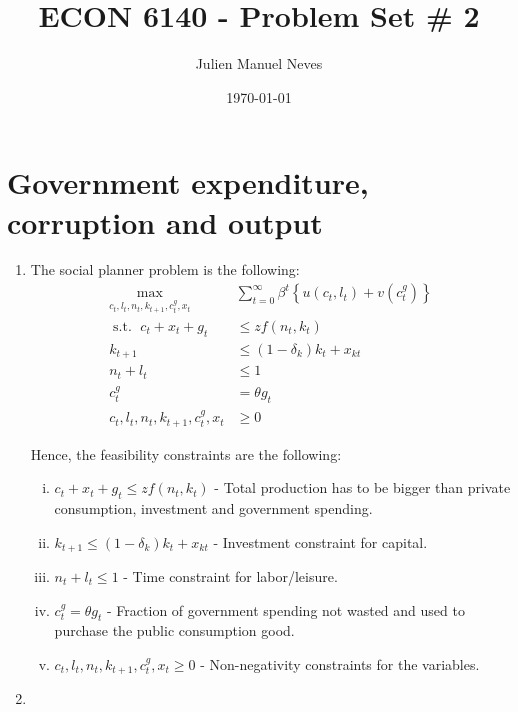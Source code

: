 \documentclass[12pt]{article}
\title{ECON 6140 - Problem Set \# 2}
\date{\today}
\author{Julien Manuel Neves}
\newcommand{\1}{{\bf 1}} %
\DeclareMathOperator{\subjectto}{{s.t.\ }} %
\begin{document}
\maketitle

\section*{Government expenditure, corruption and output}

\begin{enumerate}[(1)]
	\item 
	The social planner problem is the following:
	\begin{align*}
		\max_{c_t,l_t,n_t,k_{t+1}, c_t^g, x_t} &\sum_{t=0}^{\infty} \beta^t \left\lbrace u(c_t,l_t) +v(c_t^g) \right\rbrace \\
		\subjectto c_t+x_t+g_t & \leq zf(n_t,k_t)\\
		k_{t+1} & \leq(1-\delta_k)k_t+x_{kt}\\
		n_t+l_t &\leq 1\\
		c_t^g& = \theta g_t\\
		c_t,l_t,n_t,k_{t+1}, c_t^g, x_t & \geq 0
	\end{align*}
	
	Hence, the feasibility constraints are the following:
	\begin{enumerate}[(i)]
		\item $c_t+x_t+g_t  \leq zf(n_t,k_t)$ - Total production has to be bigger than private consumption, investment and government spending.
		\item $k_{t+1}  \leq(1-\delta_k)k_t+x_{kt}$ - Investment constraint for capital.
		\item $n_t+l_t \leq 1$ - Time constraint for labor/leisure.
		\item $c_t^g = \theta g_t$ - Fraction of government spending not wasted and used to purchase the public consumption good.
		\item $c_t,l_t,n_t,k_{t+1}, c_t^g, x_t  \geq 0$ - Non-negativity constraints for the variables.
	\end{enumerate}
	\item 
	

\end{enumerate}
\end{document}

